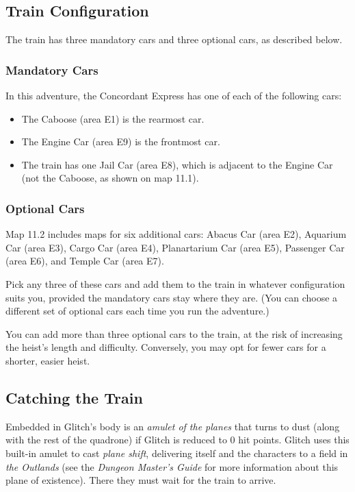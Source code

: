 \documentclass[10pt,a4paper,twoside,bg=print,twocolumn,openany,nodeprecatedcode]{dndarticle}
\begin{document}
\subsection{Train Configuration}
The train has three mandatory cars and three optional cars, as described below.

\subsubsection{Mandatory Cars}
In this adventure, the Concordant Express has one of each of the following cars:


\begin{itemize}
\item The Caboose (area E1) is the rearmost car.
\item The Engine Car (area E9) is the frontmost car.
\item The train has one Jail Car (area E8), which is adjacent to the Engine Car (not the Caboose, as shown on map 11.1).
\end{itemize}

\subsubsection{Optional Cars}
Map 11.2 includes maps for six additional cars: Abacus Car (area E2), Aquarium Car (area E3), Cargo Car (area E4), Planartarium Car (area E5), Passenger Car (area E6), and Temple Car (area E7).

Pick any three of these cars and add them to the train in whatever configuration suits you, provided the mandatory cars stay where they are. (You can choose a different set of optional cars each time you run the adventure.)

You can add more than three optional cars to the train, at the risk of increasing the heist's length and difficulty. Conversely, you may opt for fewer cars for a shorter, easier heist.

\subsection{Catching the Train}
Embedded in Glitch's body is an \textit{amulet of the planes} that turns to dust (along with the rest of the quadrone) if Glitch is reduced to 0 hit points. Glitch uses this built-in amulet to cast \textit{plane shift}, delivering itself and the characters to a field in \textit{the Outlands} (see the \textit{Dungeon Master's Guide} for more information about this plane of existence). There they must wait for the train to arrive.
\end{document}
